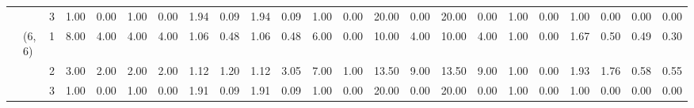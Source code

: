 \begin{tabular}{lllrrrrrrrrrrrrrrrrrrrr}
       &        & 3 &  1.00 &  0.00 &  1.00 &  0.00 & 1.94 & 0.09 & 1.94 & 0.09 & 1.00 & 0.00 & 20.00 &  0.00 & 20.00 &  0.00 & 1.00 & 0.00 &    1.00 & 0.00 &    0.00 & 0.00 \\
       & (6, 6) & 1 &  8.00 &  4.00 &  4.00 &  4.00 & 1.06 & 0.48 & 1.06 & 0.48 & 6.00 & 0.00 & 10.00 &  4.00 & 10.00 &  4.00 & 1.00 & 0.00 &    1.67 & 0.50 &    0.49 & 0.30 \\
       &        & 2 &  3.00 &  2.00 &  2.00 &  2.00 & 1.12 & 1.20 & 1.12 & 3.05 & 7.00 & 1.00 & 13.50 &  9.00 & 13.50 &  9.00 & 1.00 & 0.00 &    1.93 & 1.76 &    0.58 & 0.55 \\
       &        & 3 &  1.00 &  0.00 &  1.00 &  0.00 & 1.91 & 0.09 & 1.91 & 0.09 & 1.00 & 0.00 & 20.00 &  0.00 & 20.00 &  0.00 & 1.00 & 0.00 &    1.00 & 0.00 &    0.00 & 0.00 \\
\bottomrule
\end{tabular}
